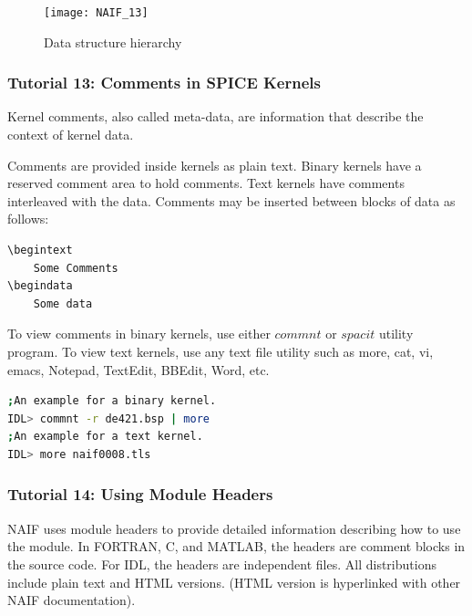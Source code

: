 \documentclass[crop=false,class=book]{standalone}
\begin{document}
\begin{figure}
    \centering
    \texttt{[image: NAIF\_13]}
    \caption{Data structure hierarchy}
    \label{fig:naif_data_structure_hierarchy}
\end{figure}
\subsubsection{Tutorial 13: Comments in SPICE Kernels}
\begin{definition}
Kernel comments, also called meta-data, are information that describe the context of kernel data.
\end{definition}
Comments are provided inside kernels as plain text. Binary kernels have a reserved comment area to hold comments. Text kernels have comments interleaved with the data. Comments may be inserted between blocks of data as follows:
\begin{lstlisting}[language=bash,basicstyle=\footnotesize]
\begintext
	Some Comments
\begindata
	Some data
\end{lstlisting}
To view comments in binary kernels, use either $commnt$ or $spacit$ utility program. To view text kernels, use any text file utility such as more, cat, vi, emacs, Notepad, TextEdit, BBEdit, Word, etc.
\begin{example}
\begin{lstlisting}[language=bash,basicstyle=\footnotesize]
;An example for a binary kernel.
IDL> commnt -r de421.bsp | more
;An example for a text kernel.
IDL> more naif0008.tls
\end{lstlisting}
\end{example}
\subsubsection{Tutorial 14: Using Module Headers}
NAIF uses module headers to provide detailed information describing how to use the module. In FORTRAN, C, and MATLAB, the headers are comment blocks in the source code. For IDL, the headers are independent files. All distributions include plain text and HTML versions. (HTML version is hyperlinked with other NAIF documentation). 
\end{document}
